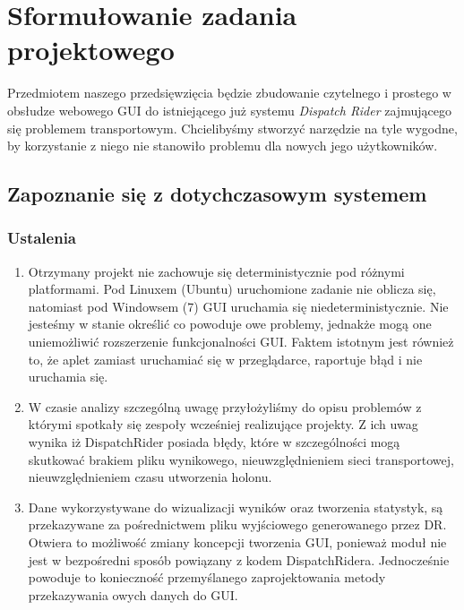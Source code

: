 \chapter{Sformułowanie zadania projektowego}
Przedmiotem naszego przedsięwzięcia będzie zbudowanie czytelnego 
i prostego w obsłudze webowego GUI do istniejącego już systemu
\emph{Dispatch Rider} zajmującego się problemem transportowym.
Chcielibyśmy stworzyć narzędzie na tyle wygodne, by korzystanie z
niego nie stanowiło problemu dla nowych jego użytkowników.

\section{Zapoznanie się z dotychczasowym systemem}
\subsection{Ustalenia}
\begin{enumerate}
\item Otrzymany projekt nie zachowuje się deterministycznie pod różnymi platformami. Pod Linuxem (Ubuntu) uruchomione zadanie nie oblicza się, natomiast pod Windowsem (7) GUI uruchamia się niedeterministycznie. Nie jesteśmy w stanie określić co powoduje owe problemy, jednakże mogą one uniemożliwić rozszerzenie funkcjonalności GUI. Faktem istotnym jest również to, że aplet zamiast uruchamiać się w przeglądarce, raportuje błąd i nie uruchamia się.
\item W czasie analizy szczególną uwagę przyłożyliśmy do opisu problemów z którymi spotkały się zespoły wcześniej realizujące projekty. Z ich uwag wynika iż DispatchRider posiada błędy, które w szczególności mogą skutkować brakiem pliku wynikowego, nieuwzględnieniem sieci transportowej, nieuwzględnieniem czasu utworzenia holonu.
\item Dane wykorzystywane do wizualizacji wyników oraz tworzenia statystyk, są przekazywane za pośrednictwem pliku wyjściowego generowanego przez DR. Otwiera to możliwość zmiany koncepcji tworzenia GUI, ponieważ moduł nie jest w bezpośredni sposób powiązany z kodem DispatchRidera. Jednocześnie powoduje to konieczność przemyślanego zaprojektowania metody przekazywania owych danych do GUI.
\end{enumerate}

